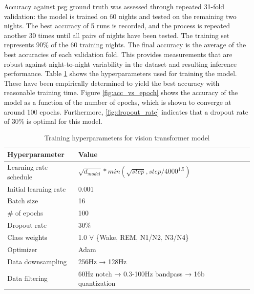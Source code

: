 Accuracy against \ac{psg} ground truth was assessed through repeated 31-fold validation: the model is trained on 60 nights and tested on the remaining two nights. The best accuracy of 5 runs is recorded, and 
the process is repeated another 30 times until all pairs of nights have been tested. The training set represents 90\% of the 60 training nights. The final accuracy is the average of the best accuracies of each
validation fold. This provides measurements that are robust against night-to-night variability in the dataset and resulting inference performance. Table \ref{tab:training_hyperparameters} shows the
hyperparameters used for training the model. These have been empirically determined to yield the best accuracy with reasonable training time. Figure \ref{fig:acc_vs_epoch} shows the accuracy of the model as a
function of the number of epochs, which is shown to converge at around 100 epochs. Furthermore, \ref{fig:dropout_rate} indicates that a dropout rate of 30\% is optimal for this model.

\begin{table}[ht]
    \centering
    \renewcommand{\arraystretch}{1.2} %
    \setlength{\arrayrulewidth}{1.5pt} %
    \caption{Training hyperparameters for vision transformer model}
    \begin{tabular}{@{} *5l @{}}
        Hyperparameter                  & Value &&&     \\\toprule
        Learning rate schedule          & $\sqrt{d_{model}}*min(\sqrt{step}, step/4000^{1.5})$ \\
        Initial learning rate           & 0.001        \\
        Batch size                      & 16            \\
        \# of epochs                    & 100           \\
        Dropout rate                    & 30\%          \\
        Class weights                   & 1.0 $\forall$ \{Wake, REM, N1/N2, N3/N4\} \\
        Optimizer                       & Adam          \\
        Data downsampling               & 256Hz → 128Hz \\
        Data filtering                  & 60Hz notch → 0.3-100Hz bandpass → 16b quantization \\            
        \hline
    \end{tabular}
    \label{tab:training_hyperparameters}
\end{table}

